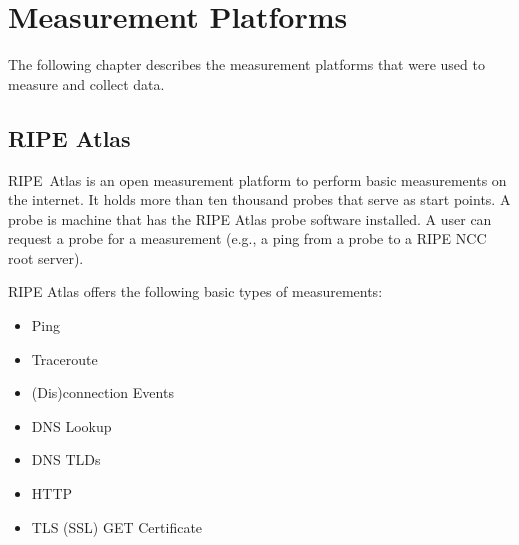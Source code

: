 \section{Measurement Platforms} \label{sec:measurement-platforms}

The following chapter describes the measurement platforms that were used to
measure and collect data.

\subsection{RIPE Atlas} \label{sec:ripe-atlas}

RIPE~Atlas is an open measurement platform to perform basic measurements on the
internet. It holds more than ten thousand probes that serve as start points. A
probe is machine that has the RIPE Atlas probe software installed. A user can
request a probe for a measurement (e.g., a ping from a probe to a RIPE NCC root
server).

RIPE Atlas offers the following basic types of measurements:

\begin{itemize}
	\item Ping
	\item Traceroute
	\item (Dis)connection Events
	\item DNS Lookup
	\item DNS TLDs
	\item HTTP
	\item TLS (SSL) GET Certificate
\end{itemize}

